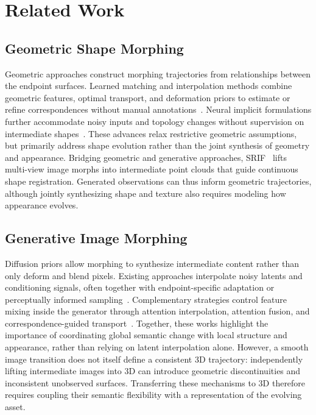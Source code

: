 \section{Related Work}
\label{sec:related}

\subsection{Geometric Shape Morphing}
Geometric approaches construct morphing trajectories from relationships between the endpoint surfaces. Learned matching and interpolation methods combine geometric features, optimal transport, and deformation priors to estimate or refine correspondences without manual annotations~\cite{eisenberger2020deepshells,eisenberger2021neuromorph,attaiki2023ncp}. Neural implicit formulations further accommodate noisy inputs and topology changes without supervision on intermediate shapes~\cite{sang2025fourdeform}. These advances relax restrictive geometric assumptions, but primarily address shape evolution rather than the joint synthesis of geometry and
appearance. Bridging geometric and generative approaches, SRIF~\cite{sun2024srif} lifts multi-view image morphs into intermediate point
clouds that guide continuous shape registration. Generated observations can thus inform geometric trajectories, although jointly synthesizing shape and texture also requires modeling how appearance evolves.

\subsection{Generative Image Morphing}
Diffusion priors allow morphing to synthesize intermediate content rather than only deform and blend pixels. Existing approaches interpolate noisy latents and conditioning signals, often together with endpoint-specific adaptation or perceptually informed
sampling~\cite{wang2023interpolating,yang2024impus,zhang2024diffmorpher}. Complementary strategies control feature mixing inside the generator through attention interpolation, attention fusion, and correspondence-guided transport~\cite{he2024aid,cao2025freemorph,shen2024dreammover}. Together, these works highlight the importance of coordinating global
semantic change with local structure and appearance, rather than relying on latent interpolation alone. However, a smooth image transition does not itself define a consistent 3D trajectory: independently lifting intermediate images into 3D can introduce geometric discontinuities and inconsistent unobserved surfaces. Transferring these mechanisms to 3D therefore requires coupling their semantic flexibility with a representation of the evolving asset.

